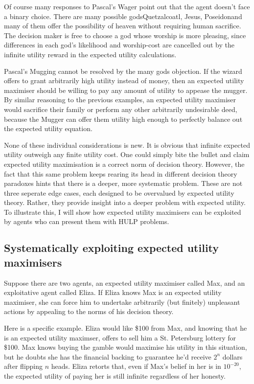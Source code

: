 \documentclass{article}
\begin{document}
Of course many responses \citep{mackie1990miracle, diderot1746pensees} to Pascal's Wager point out that the agent doesn't face a binary choice. There are many possible gods\textemdash Quetzalcoatl, Jesus, Poseidon\textemdash and many of them offer the possibility of heaven without requiring human sacrifice. The decision maker is free to choose a god whose worship is more pleasing, since differences in each god's likelihood and worship-cost are cancelled out by the infinite utility reward in the expected utility calculations.

Pascal's Mugging cannot be resolved by the many gods objection. If the wizard offers to grant arbitrarily high utility instead of money, then an expected utility maximiser should be willing to pay any amount of utility to appease the mugger. By similar reasoning to the previous examples, an expected utility maximiser would sacrifice their family or perform any other arbitrarily undesirable deed, because the Mugger can offer them utility high enough to perfectly balance out the expected utility equation.

None of these individual considerations is new. It is obvious that infinite expected utility outweigh any finite utility cost. One could simply bite the bullet and claim expected utility maximisation is a correct norm of decision theory. However, the fact that this same problem keeps rearing its head in different decision theory paradoxes hints that there is a deeper, more systematic problem. These are not three seperate edge cases, each designed to be overvalued by expected utility theory. Rather, they provide insight into a deeper problem with expected utility. To illustrate this, I will show how expected utility maximisers can be exploited by agents who can present them with HULP problems.

\subsection{Systematically exploiting expected utility maximisers}

Suppose there are two agents, an expected utility maximiser called Max, and an exploitative agent called Eliza. If Eliza knows Max is an expected utility maximiser, she can force him to undertake arbitrarily (but finitely) unpleasant actions by appealing to the norms of his decision theory. 

Here is a specific example. Eliza would like \$100 from Max, and knowing that he is an expected utility maximser, offers to sell him a St. Petersburg lottery for \$100. Max knows buying the gamble would maximise his utility in this situation, but he doubts she has the financial backing to guarantee he'd receive \(2^n\) dollars after flipping \(n\) heads. Eliza retorts that, even if Max's belief in her is in \(10^{-20}\), the expected utility of paying her is still infinite regardless of her honesty.
\end{document}

